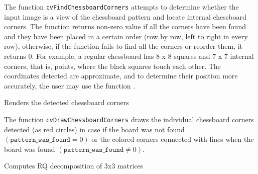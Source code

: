 The function \texttt{cvFindChessboardCorners} attempts to determine
whether the input image is a view of the chessboard pattern and
locate internal chessboard corners. The function returns non-zero
value if all the corners have been found and they have been placed
in a certain order (row by row, left to right in every row),
otherwise, if the function fails to find all the corners or reorder
them, it returns 0. For example, a regular chessboard has 8 x 8
squares and 7 x 7 internal corners, that is, points, where the black
squares touch each other. The coordinates detected are approximate,
and to determine their position more accurately, the user may use
the function .

\label{DrawChessBoardCorners}

Renders the detected chessboard corners


\begin{description}
\end{description}

The function \texttt{cvDrawChessboardCorners} draws the individual chessboard corners detected (as red circles) in case if the board was not found $(\texttt{pattern\_was\_found}=0)$ or the colored corners connected with lines when the board was found $(\texttt{pattern\_was\_found} \ne 0)$.


\label{RQDecomp3x3}

Computes RQ decomposition of 3x3 matrices



